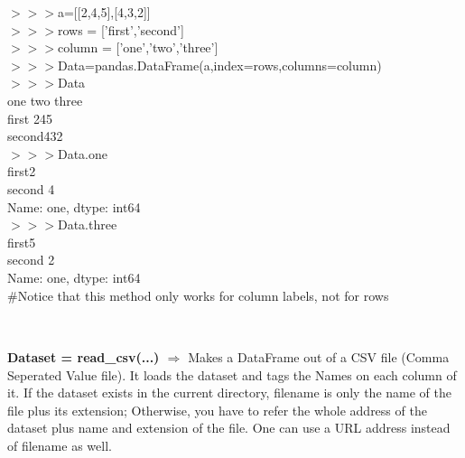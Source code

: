 \documentclass[a4paper,18pt]{article}
\begin{document}
$>>>$a=[[2,4,5],[4,3,2]]\\

$>>>$rows = ['first','second']\\

$>>>$column = ['one','two','three']\\

$>>>$Data=pandas.DataFrame(a,index=rows,columns=column)\\

$>>>$Data\\

\hspace{14pt} one  two  three\\
first \hspace*{16pt}2\hspace*{14pt}4\hspace*{14pt}5\\
second\hspace*{8pt}4\hspace*{14pt}3\hspace*{14pt}2\\

$>>>$Data.one\\

first\hspace*{14pt}2\\
\hspace*{14pt}second    4\\
\hspace*{14pt}Name: one, dtype: int64\\

$>>>$Data.three\\

first\hspace*{14pt}5\\
\hspace*{14pt}second    2\\
\hspace*{14pt}Name: one, dtype: int64\\

\#Notice that this method only works for column labels, not for rows\\\\


\subsection{\colorbox {matgreen}{\color{white}{\large read\_csv(filename,names=Names)}}}
\textbf{Dataset = read\_csv(...) $\Rightarrow$} Makes a DataFrame out of a CSV file (Comma Seperated Value file). It loads the dataset and tags the Names on each column of it. If the dataset exists in the current directory, filename is only the name of the file plus its extension; Otherwise, you have to refer the whole address of the dataset plus name and extension of the file. One can use a URL address instead of filename as well.\\\\
\end{document}
